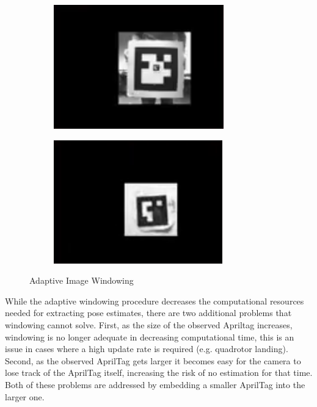 \documentclass[11pt, twocolumn]{article}
\begin{document}
\begin{figure}[H]
	\centering
	\begin{subfigure}[b]{0.45\linewidth}
		\includegraphics[width=\textwidth]{images/apriltags_roi_1.png}
	\end{subfigure}
	\begin{subfigure}[b]{0.45\linewidth}
		\includegraphics[width=\textwidth]{images/apriltags_roi_2.png}
	\end{subfigure}
	\caption{Adaptive Image Windowing}
	\label{fig:apriltags_windowing}
\end{figure}

While the adaptive windowing procedure decreases the computational resources needed for extracting pose estimates, there are two additional problems that windowing cannot solve. First, as the size of the observed Apriltag increases, windowing is no longer adequate in decreasing computational time, this is an issue in cases where a high update rate is required (e.g. quadrotor landing). Second, as the observed AprilTag gets larger it becomes easy for the camera to lose track of the AprilTag itself, increasing the risk of no estimation for that time. Both of these problems are addressed by embedding a smaller AprilTag into the larger one.
\end{document}
